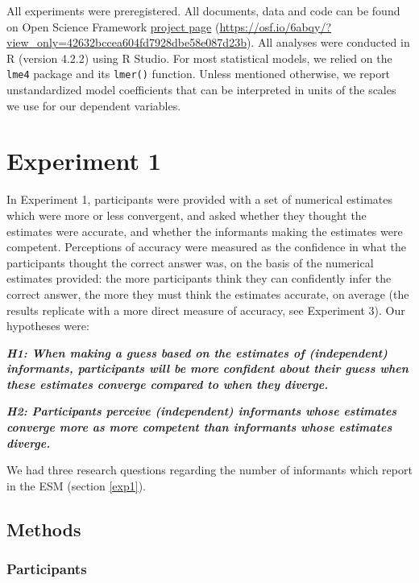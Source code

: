 \documentclass[
  doc,floatsintext]{apa6}
\begin{document}
All experiments were preregistered. All documents, data and code can be found on Open Science Framework \href{https://osf.io/6abqy/?view_only=42632bccea604fd7928dbe58e087d23b}{project page} (\url{https://osf.io/6abqy/?view_only=42632bccea604fd7928dbe58e087d23b}). All analyses were conducted in R (version 4.2.2) using R Studio. For most statistical models, we relied on the \texttt{lme4} package and its \texttt{lmer()} function. Unless mentioned otherwise, we report unstandardized model coefficients that can be interpreted in units of the scales we use for our dependent variables.

\section{Experiment 1}\label{experiment-1}

In Experiment 1, participants were provided with a set of numerical estimates which were more or less convergent, and asked whether they thought the estimates were accurate, and whether the informants making the estimates were competent. Perceptions of accuracy were measured as the confidence in what the participants thought the correct answer was, on the basis of the numerical estimates provided: the more participants think they can confidently infer the correct answer, the more they must think the estimates accurate, on average (the results replicate with a more direct measure of accuracy, see Experiment 3). Our hypotheses were:

\textbf{\emph{H1: When making a guess based on the estimates of (independent) informants, participants will be more confident about their guess when these estimates converge compared to when they diverge.}}

\textbf{\emph{H2: Participants perceive (independent) informants whose estimates converge more as more competent than informants whose estimates diverge.}}

We had three research questions regarding the number of informants which report in the ESM (section \ref{exp1}).

\subsection{Methods}\label{methods}

\subsubsection{Participants}\label{participants}
\end{document}
